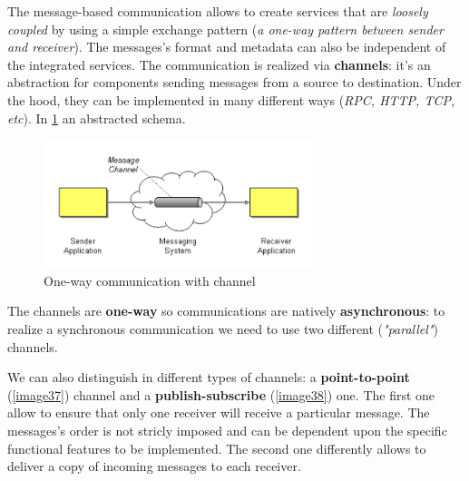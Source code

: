 \documentclass[10pt,a4paper]{report}
\begin{document}
The message-based communication allows to create services that are \textit{loosely coupled} by using a simple exchange pattern (\textit{a one-way pattern between sender and receiver}). The messages's format and metadata can also be independent of the integrated services. The communication is realized via \textbf{channels}: it's an abstraction for components sending messages from a source to destination. Under the hood, they can be implemented in many different ways (\textit{RPC, HTTP, TCP, etc}). In \ref{image36} an abstracted schema.
  \begin{figure}[h]
 	\centering
 	\includegraphics[width=0.7\textwidth]{image36}
 	\caption{One-way communication with channel}
 	\label{image36}
 \end{figure}
The channels are \textbf{one-way} so communications are natively \textbf{asynchronous}: to realize a synchronous communication we need to use two different (\textit{"parallel"}) channels. 

We can also distinguish in different types of channels: a \textbf{point-to-point} (\ref{image37}) channel and a \textbf{publish-subscribe} (\ref{image38}) one. The first one allow to ensure that only one receiver will receive a particular message. The messages's order is not stricly imposed and can be dependent upon the specific functional features to be implemented.
The second one differently allows to deliver a copy of incoming messages to each receiver. 
\end{document}
